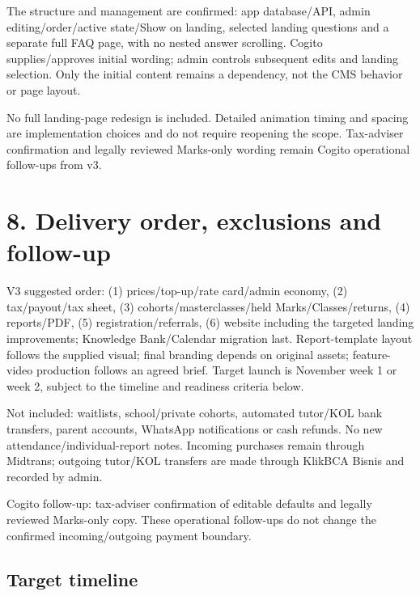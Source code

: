 \documentclass[11pt,a4paper]{article}
\begin{document}
The structure and management are confirmed: app database/\allowbreak{}API, admin editing/\allowbreak{}order/\allowbreak{}active state/\allowbreak{}Show on landing, selected landing questions and a separate full FAQ page, with no nested answer scrolling. Cogito supplies/\allowbreak{}approves initial wording; admin controls subsequent edits and landing selection. Only the initial content remains a dependency, not the CMS behavior or page layout.

No full landing-page redesign is included. Detailed animation timing and spacing are implementation choices and do not require reopening the scope. Tax-adviser confirmation and legally reviewed Marks-only wording remain Cogito operational follow-ups from v3.

\section*{8. Delivery order, exclusions and follow-up}
V3 suggested order: (1) prices/\allowbreak{}top-up/\allowbreak{}rate card/\allowbreak{}admin economy, (2) tax/\allowbreak{}payout/\allowbreak{}tax sheet, (3) cohorts/\allowbreak{}masterclasses/\allowbreak{}held Marks/\allowbreak{}Classes/\allowbreak{}returns, (4) reports/\allowbreak{}PDF, (5) registration/\allowbreak{}referrals, (6) website including the targeted landing improvements; Knowledge Bank/\allowbreak{}Calendar migration last. Report-template layout follows the supplied visual; final branding depends on original assets; feature-video production follows an agreed brief. Target launch is November week 1 or week 2, subject to the timeline and readiness criteria below.

Not included: waitlists, school/\allowbreak{}private cohorts, automated tutor/\allowbreak{}KOL bank transfers, parent accounts, WhatsApp notifications or cash refunds. No new attendance/\allowbreak{}individual-report notes. Incoming purchases remain through Midtrans; outgoing tutor/\allowbreak{}KOL transfers are made through KlikBCA Bisnis and recorded by admin.

Cogito follow-up: tax-adviser confirmation of editable defaults and legally reviewed Marks-only copy. These operational follow-ups do not change the confirmed incoming/\allowbreak{}outgoing payment boundary.

\subsection*{Target timeline}
\end{document}
